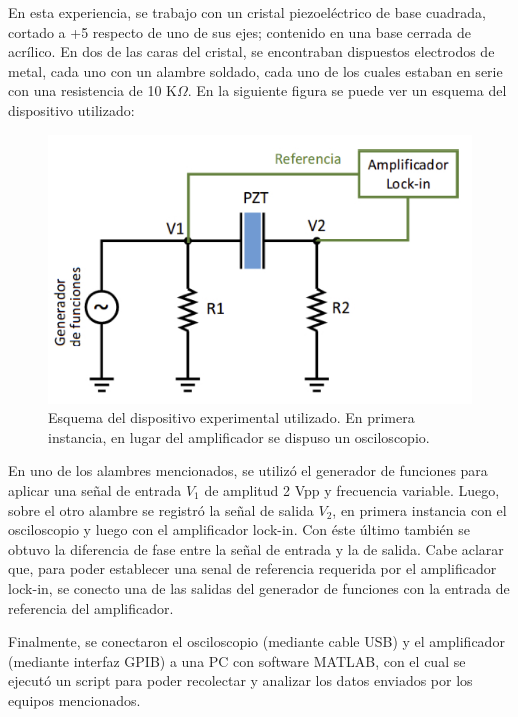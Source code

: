 \documentclass[twoside,twocolumn,a4paper]{article}
\begin{document}
En esta experiencia, se trabajo con un cristal piezoel\'ectrico de base cuadrada, cortado a +5 \degree respecto de uno de sus ejes; contenido en una base cerrada de acr\'ilico. En dos de las caras del cristal, se encontraban dispuestos electrodos de metal, cada uno con un alambre soldado, cada uno de los cuales estaban en serie con una resistencia de 10 K$\Omega$. En la siguiente figura se puede ver un esquema del dispositivo utilizado:

\begin{figure}[H]
\includegraphics[width=\linewidth]{dispexp.jpg}
\caption{Esquema del dispositivo experimental utilizado. En primera instancia, en lugar del amplificador se dispuso un osciloscopio.}
\label{fig:dispexp}
\end{figure}

En uno de los alambres mencionados, se utiliz\'o el generador de funciones para aplicar una se\~nal de entrada $V_{1}$ de amplitud 2 Vpp y frecuencia variable. Luego, sobre el otro alambre se registr\'o la se\~nal de salida $V_{2}$, en primera instancia con el osciloscopio y luego con el amplificador lock-in. Con \'este \'ultimo tambi\'en se obtuvo la diferencia de fase entre la se\~nal de entrada y la de salida. Cabe aclarar que, para poder establecer una senal de referencia requerida por el amplificador lock-in, se conecto una de las salidas del generador de funciones con la entrada de referencia del amplificador.


Finalmente, se conectaron el osciloscopio (mediante cable USB) y el amplificador (mediante interfaz GPIB) a una PC con software MATLAB,    con el cual se ejecut\'o un script para poder recolectar y analizar los datos enviados por los equipos mencionados.
\end{document}
